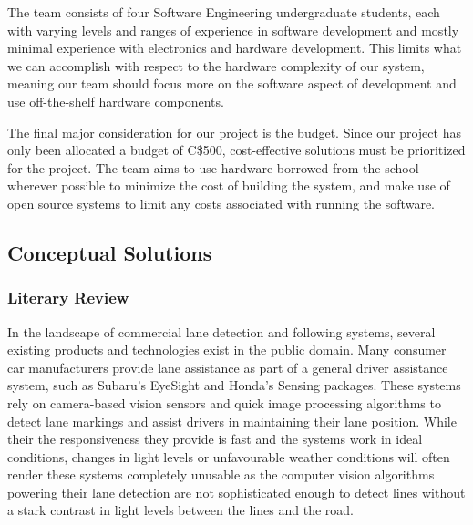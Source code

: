 \documentclass[titlepage, draft]{article}
\begin{document}
The team consists of four Software Engineering undergraduate students, each with varying levels and ranges of experience in software development and mostly minimal experience with electronics and hardware development. This limits what we can accomplish with respect to the hardware complexity of our system, meaning our team should focus more on the software aspect of development and use off-the-shelf hardware components.

The final major consideration for our project is the budget. Since our project has only been allocated a budget of C\$500, cost-effective solutions must be prioritized for the project. The team aims to use hardware borrowed from the school wherever possible to minimize the cost of building the system, and make use of open source systems to limit any costs associated with running the software.

\subsection{Conceptual Solutions}

\subsubsection{Literary Review}

In the landscape of commercial lane detection and following systems, several existing products and technologies exist in the public domain. Many consumer car manufacturers provide lane assistance as part of a general driver assistance system, such as Subaru's EyeSight\cite{subaru_eyesight} and Honda's Sensing \cite{honda_sensing} packages. These systems rely on camera-based vision sensors and quick image processing algorithms to detect lane markings and assist drivers in maintaining their lane position. While their the responsiveness they provide is fast and the systems work in ideal conditions, changes in light levels or unfavourable weather conditions will often render these systems completely unusable as the computer vision algorithms powering their lane detection are not sophisticated enough to detect lines without a stark contrast in light levels between the lines and the road.
\end{document}
